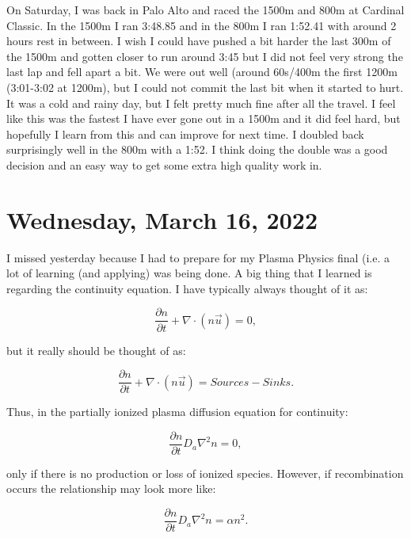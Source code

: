 \documentclass[12pt]{article}
\begin{document}
\par
On Saturday, I was back in Palo Alto and raced the 1500m and 800m at Cardinal Classic. In the 1500m I ran 3:48.85 and in the 800m I ran 1:52.41 with around 2 hours rest in between. I wish I could have pushed a bit harder the last 300m of the 1500m and gotten closer to run around 3:45 but I did not feel very strong the last lap and fell apart a bit. We were out well (around 60s/400m the first 1200m (3:01-3:02 at 1200m), but I could not commit the last bit when it started to hurt. It was a cold and rainy day, but I felt pretty much fine after all the travel. I feel like this was the fastest I have ever gone out in a 1500m and it did feel hard, but hopefully I learn from this and can improve for next time. I doubled back surprisingly well in the 800m with a 1:52. I think doing the double was a good decision and an easy way to get some extra high quality work in. 

\section{Wednesday, March 16, 2022}

\par
I missed yesterday because I had to prepare for my Plasma Physics final (i.e. a lot of learning (and applying) was being done. A big thing that I learned is regarding the continuity equation. I have typically always thought of it as:

\begin{equation}
\frac{\partial n}{\partial t} + \nabla \cdot (n \vec{u}) = 0,
\end{equation}

but it really should be thought of as:

\begin{equation}
\frac{\partial n}{\partial t} + \nabla \cdot (n \vec{u}) = Sources - Sinks.
\end{equation}

Thus, in the partially ionized plasma diffusion equation for continuity:

\begin{equation}
\frac{\partial n}{\partial t}  D_a \nabla ^2 n = 0,
\end{equation}

only if there is no production or loss of ionized species. However, if recombination occurs the relationship may look more like:

\begin{equation}
\frac{\partial n}{\partial t}  D_a \nabla ^2 n = \alpha n^2.
\end{equation}
\end{document}

